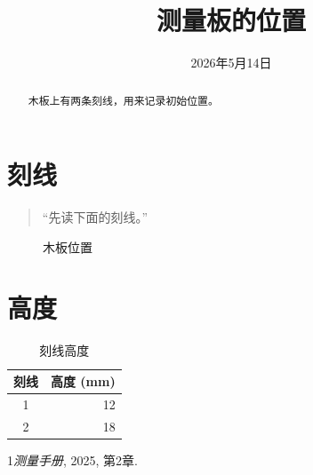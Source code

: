 \documentclass{article}
\begin{document}
\title{测量板的位置}\author{}\date{2026年5月14日}\maketitle
\begin{abstract}木板上有两条刻线，用来记录初始位置。\end{abstract}
\tableofcontents
\section{刻线}\begin{quote}“先读下面的刻线。”\end{quote}
\begin{figure}[ht]\centering\fbox{\rule{0pt}{8mm}\rule{33mm}{0pt}}\caption{木板位置}\end{figure}
\section{高度}
\begin{table}[ht]\centering\begin{tabular}{cr}刻线&高度 (mm)\\\hline 1&12\\2&18\end{tabular}\caption{刻线高度}\end{table}
\begin{thebibliography}{1}\emph{测量手册}, 2025, 第2章.\end{thebibliography}
\end{document}
